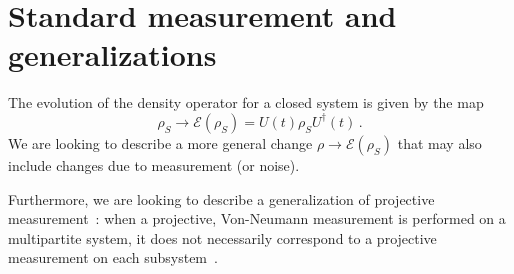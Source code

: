 \section{Standard measurement and generalizations}

The evolution of the density operator for a closed system is given by the map
\[
    \rho_{S} \rightarrow \mathcal{E}(\rho_{S}) = U(t)\rho_{S}U^{\dagger}(t) \, \text{.}
\]
We are looking to describe a more general change
$\rho \rightarrow \mathcal{E}(\rho_{S})$ that may also include
changes due to measurement (or noise).

Furthermore, we are looking to describe a generalization
of projective measurement~\parencite{VonNeumann}:
when a projective, Von-Neumann
measurement is performed on a multipartite system,
it does not necessarily correspond to a projective measurement
on each subsystem~\parencite[]{PreskillNotes}.








